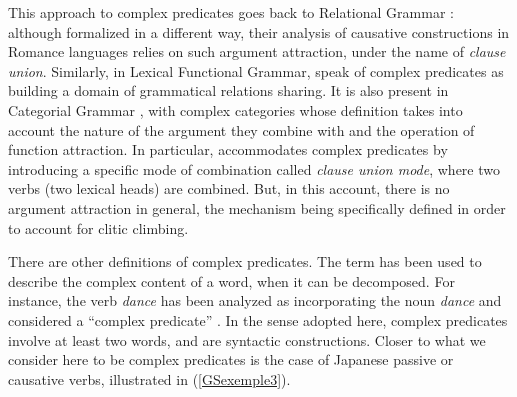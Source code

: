 {	\label{GSexemple1c} 
\zl


\eal 
	\label{GSexemple2} 
	\label{GSexemple2a}
		
	\label{GSexemple2b}
		
		
	\label{GSexemple2c}			
\zl


This approach to complex predicates goes back to Relational Grammar \citep{aissen1983clause}: although formalized in a different way, their analysis of causative constructions in Romance languages relies on such argument attraction, under the name of \emph{clause union}. Similarly, in Lexical Functional Grammar, \cite{andrews1999complex} speak of complex predicates as building a domain of grammatical relations sharing. It is also present in Categorial Grammar \citep{Geach70a}, with complex categories whose definition takes into account the nature of the argument they combine with and the operation of function attraction. In particular, \cite[301]{kraak1998deductive} accommodates complex predicates by introducing a specific mode of combination called \emph{clause union mode}, where two verbs (two lexical heads) are combined. But, in this account, there is no argument attraction in general, the mechanism being specifically defined in order to account for clitic climbing.


There are other definitions of complex predicates. The term has been used to describe the complex content of a word, when it can be decomposed. For instance, the verb \emph{dance} has been analyzed as incorporating the noun \emph{dance} and considered a ``complex predicate'' \citep{HK97a-u}. In the sense adopted here, complex predicates involve at least two words, and are syntactic constructions. Closer to what we consider here to be complex predicates is the case of Japanese passive or causative verbs, illustrated in (\ref{GSexemple3}).

}

